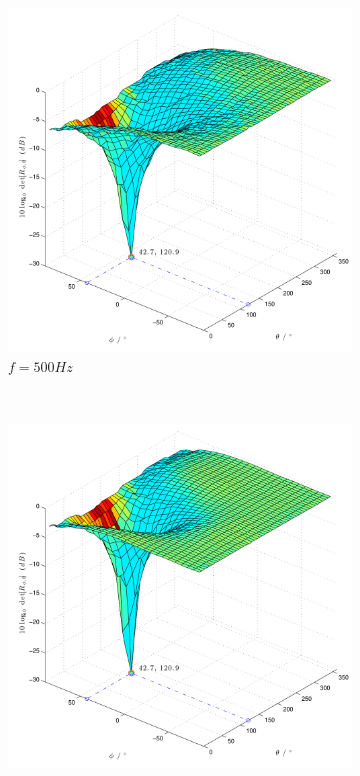 \begin{figure}
\begin{subfigure}[b]{0.48\textwidth}
                \includegraphics[width=\textwidth]{images/02_Konzeptionierung/Sim_sine_f_500_Phi_45_Theta_120_dB_SNR_100dB}
                \caption{$f=500Hz$}
                \label{fig:Sim_sine_f_500_Phi_45_Theta_120_dB_SNR_100dB}
        \end{subfigure}
        ~ %
        \begin{subfigure}[b]{0.48\textwidth}
                \centering
                \includegraphics[width=\textwidth]{images/02_Konzeptionierung/Sim_sine_f_1000_Phi_45_Theta_120_dB_SNR_100dB}

\end{subfigure}
\end{figure}
